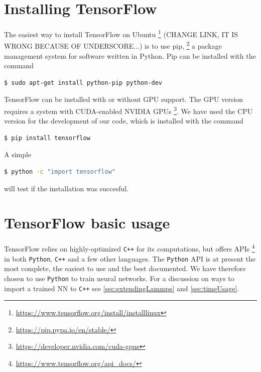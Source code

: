 \documentclass[twoside,english]{uiofysmaster}
\begin{document}
\section{Installing TensorFlow}
The easiest way to install TensorFlow on Ubuntu
\footnote{\href{https://www.tensorflow.org/install/install\_linux}
{https://www.tensorflow.org/install/installlinux}}
(CHANGE LINK, IT IS WRONG BECAUSE OF UNDERSCORE...)
is to use pip, \footnote{\href{https://pip.pypa.io/en/stable/}
{https://pip.pypa.io/en/stable/}}
a package management system for software written in 
Python. Pip can be installed with the 
command
\begin{lstlisting}[language=bash]
 $ sudo apt-get install python-pip python-dev
\end{lstlisting}
TensorFlow can be installed with or without GPU 
support. The GPU version requires a system with
 CUDA-enabled NVIDIA GPUs
\footnote{\href{https://developer.nvidia.com/cuda-gpus}
{https://developer.nvidia.com/cuda-gpus}}. 
We have used the CPU version for the
development of our code, which is installed
with the command
\begin{lstlisting}[language=bash]
 $ pip install tensorflow
\end{lstlisting}
A simple
\begin{lstlisting}[language=bash]
 $ python -c "import tensorflow"
\end{lstlisting}
will test if the installation was succesful. 

\section{TensorFlow basic usage}
TensorFlow relies on highly-optimized
\texttt{C++} for its computations, but offers
APIs \footnote{\href{https://www.tensorflow.org/api_docs/}
{https://www.tensorflow.org/api\_docs/}}
in both \texttt{Python},
\texttt{C++} and a few other languages. 
The \texttt{Python} API is at present the most
complete, the easiest to use and the best documented.
We have therefore chosen to use \texttt{Python}
to train neural networks. For a discussion
on ways to import a trained NN to \texttt{C++} see
\autoref{sec:extendingLammps}
and \autoref{sec:timeUsage}. 
\end{document}
